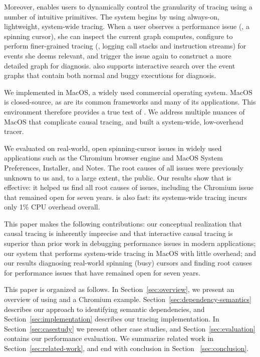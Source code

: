 Moreover, \xxx enables users to dynamically control the granularity of tracing
using a number of intuitive primitives. The system begins by using always-on,
lightweight, system-wide tracing.  When a user observes a performance issue
(\eg, a spinning cursor), she can inspect the current graph \xxx computes,
configure \xxx to perform finer-grained tracing (\eg, logging call stacks and
instruction streams) for events she deems relevant, and trigger the issue again
to construct a more detailed graph for diagnosis.  \xxx also supports
interactive search over the event graphs that contain both normal and buggy
executions for diagnosis.

We implemented \xxx in MacOS, a widely used commercial operating system. MacOS
is closed-source, as are its common frameworks and many of its applications.
This environment therefore provides a true test of \xxx.  We address multiple
nuances of MacOS that complicate causal tracing, and built a system-wide,
low-overhead tracer.

We evaluated \xxx on \nbug real-world, open spinning-cursor issues in widely
used applications such as the Chromium browser engine and MacOS System
Preferences, Installer, and Notes.  The root causes of all \nbug issues were
previously unknown to us and, to a large extent, the public. Our results show
that \xxx is effective: it helped us find all root causes of issues, including
the Chromium issue that remained open for seven years.  \xxx is also fast: its
systems-wide tracing incurs only 1\% CPU overhead overall.

This paper makes the following contributions: our conceptual realization that
causal tracing is inherently imprecise and that interactive causal tracing is
superior than prior work in debugging performance issues in modern
applications; our system \xxx that performs system-wide tracing in MacOS with
little overhead; and our results diagnosing real-world spinning (busy) cursors
and finding root causes for performance issues that have remained open for
seven years.

This paper is organized as follows. In Section~\ref{sec:overview}, we present
an overview of using \xxx and a Chromium example.
Section~\ref{sec:dependency-semantics} describes our approach to identifying
semantic dependencies, and Section~\ref{sec:implementation} describes our
tracing implementation. In Section~\ref{sec:casestudy} we present other case
studies, and Section~\ref{sec:evaluation} contains our performance evaluation.
We summarize related work in Section~\ref{sec:related-work}, and end with
conclusion in Section ~\ref{sec:conclusion}.
